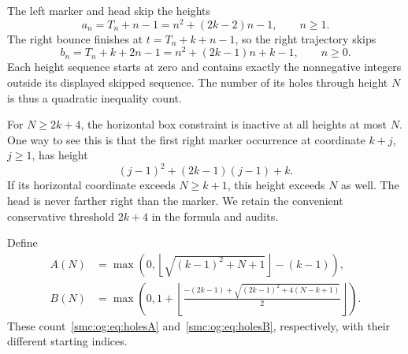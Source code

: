 \documentclass[11pt,letterpaper]{article}
\numberwithin{equation}{section}
\theoremstyle{definition}
\theoremstyle{remark}
\begin{document}
The left marker and head skip the heights
\begin{equation}\label{smc:og:eq:holesA}
 a_n=T_n+n-1=n^2+(2k-2)n-1,\qquad n\ge1.
\end{equation}
The right bounce finishes at $t=T_n+k+n-1$, so the right trajectory skips
\begin{equation}\label{smc:og:eq:holesB}
 b_n=T_n+k+2n-1=n^2+(2k-1)n+k-1,\qquad n\ge0.
\end{equation}
Each height sequence starts at zero and contains exactly the nonnegative integers outside its displayed skipped sequence. The number of its holes through height $N$ is thus a quadratic inequality count.

For $N\ge2k+4$, the horizontal box constraint is inactive at all heights at most $N$. One way to see this is that the first right marker occurrence at coordinate $k+j$, $j\ge1$, has height
\[
 (j-1)^2+(2k-1)(j-1)+k.
\]
If its horizontal coordinate exceeds $N\ge k+1$, this height exceeds $N$ as well. The head is never farther right than the marker. We retain the convenient conservative threshold $2k+4$ in the formula and audits.

Define
\begin{align}
 A(N)&=\max\left(0,\left\lfloor\sqrt{(k-1)^2+N+1}\right\rfloor-(k-1)\right),\label{smc:og:eq:AN}\\
 B(N)&=\max\left(0,1+\left\lfloor
 \frac{-(2k-1)+\sqrt{(2k-1)^2+4(N-k+1)}}2
 \right\rfloor\right).\label{smc:og:eq:BN}
\end{align}
These count~\eqref{smc:og:eq:holesA} and~\eqref{smc:og:eq:holesB}, respectively, with their different starting indices.
\end{document}
